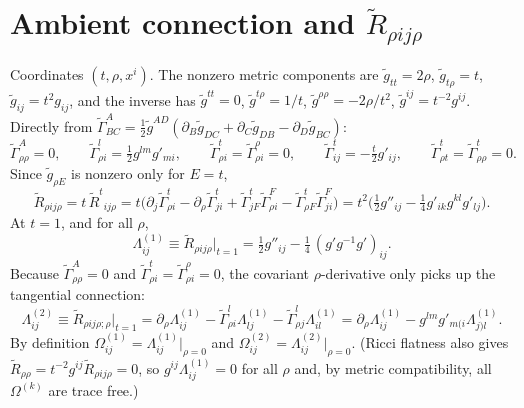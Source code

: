 \documentclass[11pt]{article}
\begin{document}
\section{Ambient connection and $\tilde R_{\rho ij\rho}$}
Coordinates $(t,\rho,x^i)$. The nonzero metric components are $\tilde g_{tt}=2\rho$, $\tilde g_{t\rho}=t$, $\tilde g_{ij}=t^2g_{ij}$, and the inverse has $\tilde g^{tt}=0$, $\tilde g^{t\rho}=1/t$, $\tilde g^{\rho\rho}=-2\rho/t^2$, $\tilde g^{ij}=t^{-2}g^{ij}$. Directly from $\tilde\Gamma^A_{BC}=\frac12\tilde g^{AD}(\partial_B\tilde g_{DC}+\partial_C\tilde g_{DB}-\partial_D\tilde g_{BC})$:
\begin{equation}
\tilde\Gamma^A_{\rho\rho}=0,\qquad \tilde\Gamma^l_{\rho i}=\tfrac12g^{lm}g'_{mi},\qquad \tilde\Gamma^t_{\rho i}=\tilde\Gamma^\rho_{\rho i}=0,\qquad \tilde\Gamma^t_{ij}=-\tfrac t2g'_{ij},\qquad \tilde\Gamma^t_{\rho t}=\tilde\Gamma^t_{\rho\rho}=0 .
\end{equation}
Since $\tilde g_{\rho E}$ is nonzero only for $E=t$,
\begin{equation}
\tilde R_{\rho ij\rho}=t\,\tilde R^t{}_{ij\rho}=t\big(\partial_j\tilde\Gamma^t_{\rho i}-\partial_\rho\tilde\Gamma^t_{ji}+\tilde\Gamma^t_{jF}\tilde\Gamma^F_{\rho i}-\tilde\Gamma^t_{\rho F}\tilde\Gamma^F_{ji}\big)
=t^2\Big(\tfrac12g''_{ij}-\tfrac14g'_{ik}g^{kl}g'_{lj}\Big).
\end{equation}
At $t=1$, and for all $\rho$,
\begin{equation}
\Lambda^{(1)}_{ij}\equiv\tilde R_{\rho ij\rho}\big|_{t=1}=\tfrac12g''_{ij}-\tfrac14\,(g'g^{-1}g')_{ij}.
\label{eq:L1}
\end{equation}
Because $\tilde\Gamma^A_{\rho\rho}=0$ and $\tilde\Gamma^t_{\rho i}=\tilde\Gamma^\rho_{\rho i}=0$, the covariant $\rho$-derivative only picks up the tangential connection:
\begin{equation}
\Lambda^{(2)}_{ij}\equiv\tilde R_{\rho ij\rho;\rho}\big|_{t=1}=\partial_\rho\Lambda^{(1)}_{ij}-\tilde\Gamma^l_{\rho i}\Lambda^{(1)}_{lj}-\tilde\Gamma^l_{\rho j}\Lambda^{(1)}_{il}
=\partial_\rho\Lambda^{(1)}_{ij}-g^{lm}g'_{m(i}\Lambda^{(1)}_{j)l}.
\label{eq:L2}
\end{equation}
By definition $\Omega^{(1)}_{ij}=\Lambda^{(1)}_{ij}|_{\rho=0}$ and $\Omega^{(2)}_{ij}=\Lambda^{(2)}_{ij}|_{\rho=0}$. (Ricci flatness also gives $\tilde R_{\rho\rho}=t^{-2}g^{ij}\tilde R_{\rho ij\rho}=0$, so $g^{ij}\Lambda^{(1)}_{ij}=0$ for all $\rho$ and, by metric compatibility, all $\Omega^{(k)}$ are trace free.)
\end{document}
